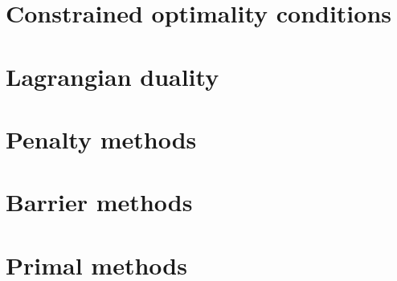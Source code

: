 \documentclass{bookest}
\begin{document}
	\chapter{Constrained optimality conditions}
		
	
	\chapter{Lagrangian duality}
		
	
	\chapter{Penalty methods}
	
	
	\chapter{Barrier methods}
	
	
	\chapter{Primal methods}
	
	
	
	 
	
\end{document}
